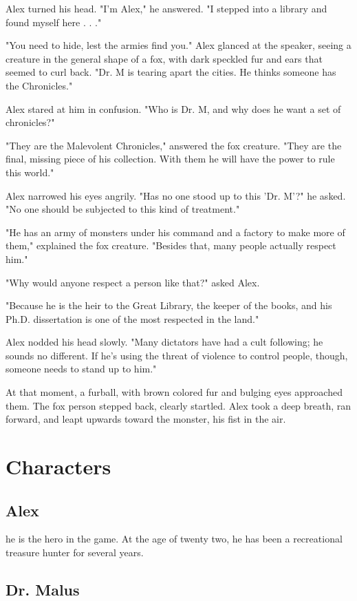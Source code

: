 \documentclass{gd-document}
\begin{document}
Alex turned his head. "I'm Alex," he answered. "I stepped into a
library and found myself here . . ."

"You need to hide, lest the armies find you." Alex glanced at the
speaker, seeing a creature in the general shape of a fox, with dark
speckled fur and ears that seemed to curl back. "Dr. M is tearing
apart the cities. He thinks someone has the Chronicles."

Alex stared at him in confusion. "Who is Dr. M, and why does he want a
set of chronicles?"

"They are the Malevolent Chronicles," answered the fox creature. "They
are the final, missing piece of his collection. With them he will have
the power to rule this world."

Alex narrowed his eyes angrily. "Has no one stood up to this 'Dr. M'?"
he asked. "No one should be subjected to this kind of treatment."

"He has an army of monsters under his command and a factory to make
more of them," explained the fox creature. "Besides that, many people
actually respect him."

"Why would anyone respect a person like that?" asked Alex.

"Because he is the heir to the Great Library, the keeper of the books,
and his Ph.D. dissertation is one of the most respected in the land."

Alex nodded his head slowly. "Many dictators have had a cult
following; he sounds no different. If he's using the threat of
violence to control people, though, someone needs to stand up to him."

At that moment, a furball, with brown colored fur and bulging eyes
approached them. The fox person stepped back, clearly startled. Alex
took a deep breath, ran forward, and leapt upwards toward the monster,
his fist in the air.

\section{Characters}

\subsection{Alex}

he is the hero in the game. At the age of twenty two, he has been a
recreational treasure hunter for several years.

\subsection{Dr. Malus}
\end{document}
